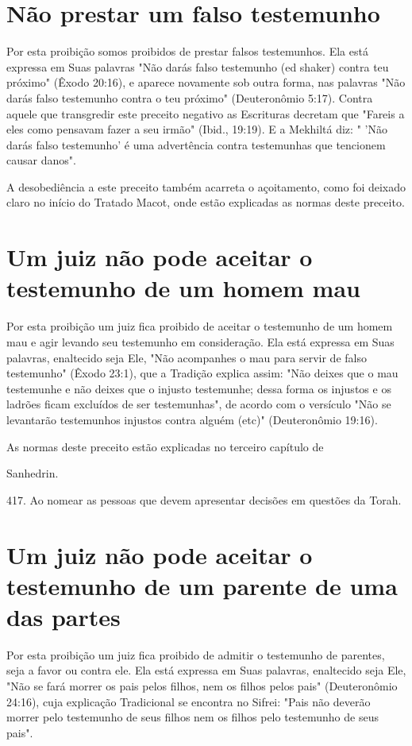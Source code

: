 \begin{itemize}
\begin{enumrate}
\begin{itemize}
\begin{itemize}
\begin{itemize}
\section{Não prestar um falso testemunho}

Por esta proibição somos proibidos de prestar falsos testemunhos. Ela
está expressa em Suas palavras "Não darás falso testemunho (ed shaker)
con­tra teu próximo" (Êxodo 20:16), e aparece novamente sob outra forma,
nas pa­lavras "Não darás falso testemunho contra o teu próximo"
(Deuteronômio 5:17). Contra aquele que transgredir este preceito
negativo as Escrituras decretam que "Fareis a eles como pensavam fazer a
seu irmão" (Ibid., 19:19). E a Mekhiltá diz: " 'Não darás falso
testemunho' é uma advertência contra testemunhas que tencionem causar
danos".

A desobediência a este preceito também acarreta o açoitamento, co­mo foi
deixado claro no início do Tratado Macot, onde estão explicadas as
nor­mas deste preceito.

\section{Um juiz não pode aceitar o testemunho de um homem mau}

Por esta proibição um juiz fica proibido de aceitar o testemunho de um
homem mau e agir levando seu testemunho em consideração. Ela está
expressa em Suas palavras, enaltecido seja Ele, "Não acompanhes o mau
para servir de fal­so testemunho" (Êxodo 23:1), que a Tradição explica
assim: "Não deixes que o mau testemunhe e não deixes que o injusto
testemunhe; dessa forma os injustos e os ladrões ficam excluídos de ser
testemunhas", de acordo com o versículo "Não se levantarão testemunhos
injustos contra alguém (etc)" (Deuteronômio 19:16).


As normas deste preceito estão explicadas no terceiro capítulo de


Sanhedrin.

417. Ao nomear as pessoas que devem apresentar decisões em questões da
Torah.

\section{Um juiz não pode aceitar o testemunho de um parente de uma das partes}

Por esta proibição um juiz fica proibido de admitir o testemunho de
parentes, seja a favor ou contra ele. Ela está expressa em Suas
palavras, enal­tecido seja Ele, "Não se fará morrer os pais pelos
filhos, nem os filhos pelos pais" (Deuteronômio 24:16), cuja explicação
Tradicional se encontra no Sifrei: "Pais não deverão morrer pelo
testemunho de seus filhos nem os filhos pelo testemunho de seus pais".


\end{itemize}
\end{itemize}
\end{itemize}
\end{enumrate}
\end{itemize}
